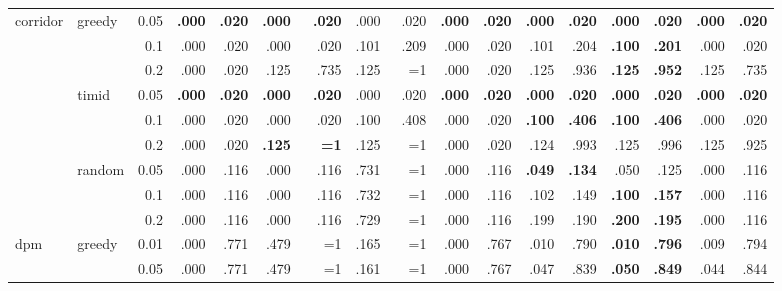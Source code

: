 \documentclass{article}
\begin{document}
\begin{table}[h]
{\begin{tabular}{l@{\hskip 12pt} l@{\hskip 12pt} r@{\hskip 12pt} rr@{\hskip 12pt} rr@{\hskip 12pt} rr@{\hskip 12pt} rr@{\hskip 12pt} rr@{\hskip 12pt} rr@{\hskip 12pt} rr@{\hskip 12pt}}
\multirow{9}{*}{corridor} & \multirow{3}{*}{greedy} & 0.05 & \textbf{.000} & \textbf{.020} & \textbf{.000} & \textbf{.020} & .000 & .020 & \textbf{.000} & \textbf{.020} & \textbf{.000} & \textbf{.020} & \textbf{.000} & \textbf{.020} & \textbf{.000} & \textbf{.020} \\
 &  & 0.1 & .000 & .020 & .000 & .020 & \cellcolor{red!20}.101 & \cellcolor{red!20}.209 & .000 & .020 & \cellcolor{red!20}.101 & \cellcolor{red!20}.204 & \textbf{.100} & \textbf{.201} & .000 & .020 \\
 &  & 0.2 & .000 & .020 & .125 & .735 & .125 & ~~{=}1 & .000 & .020 & .125 & .936 & \textbf{.125} & \textbf{.952} & .125 & .735 \\
 \cmidrule(lr){2-17}
 & \multirow{3}{*}{timid} & 0.05 & \textbf{.000} & \textbf{.020} & \textbf{.000} & \textbf{.020} & .000 & .020 & \textbf{.000} & \textbf{.020} & \textbf{.000} & \textbf{.020} & \textbf{.000} & \textbf{.020} & \textbf{.000} & \textbf{.020} \\
 &  & 0.1 & .000 & .020 & .000 & .020 & .100 & .408 & .000 & .020 & \textbf{.100} & \textbf{.406} & \textbf{.100} & \textbf{.406} & .000 & .020 \\
 &  & 0.2 & .000 & .020 & \textbf{.125} & \textbf{~~{=}1} & .125 & ~~{=}1 & .000 & .020 & .124 & .993 & .125 & .996 & .125 & .925 \\
 \cmidrule(lr){2-17}
 & \multirow{3}{*}{random} & 0.05 & .000 & .116 & .000 & .116 & \cellcolor{red!20}.731 & \cellcolor{red!20}~~{=}1 & .000 & .116 & \textbf{.049} & \textbf{.134} & .050 & .125 & .000 & .116 \\
 &  & 0.1 & .000 & .116 & .000 & .116 & \cellcolor{red!20}.732 & \cellcolor{red!20}~~{=}1 & .000 & .116 & \cellcolor{red!20}.102 & \cellcolor{red!20}.149 & \textbf{.100} & \textbf{.157} & .000 & .116 \\
 &  & 0.2 & .000 & .116 & .000 & .116 & \cellcolor{red!20}.729 & \cellcolor{red!20}~~{=}1 & .000 & .116 & .199 & .190 & \textbf{.200} & \textbf{.195} & .000 & .116 \\
 \cmidrule(lr){1-17}
\multirow{9}{*}{dpm} & \multirow{3}{*}{greedy} & 0.01 & .000 & .771 & \cellcolor{red!20}.479 & \cellcolor{red!20}~~{=}1 & \cellcolor{red!20}.165 & \cellcolor{red!20}~~{=}1 & .000 & .767 & .010 & .790 & \textbf{.010} & \textbf{.796} & .009 & .794 \\
 &  & 0.05 & .000 & .771 & \cellcolor{red!20}.479 & \cellcolor{red!20}~~{=}1 & \cellcolor{red!20}.161 & \cellcolor{red!20}~~{=}1 & .000 & .767 & .047 & .839 & \textbf{.050} & \textbf{.849} & .044 & .844 \\

\end{tabular}}
\end{table}
\end{document}
